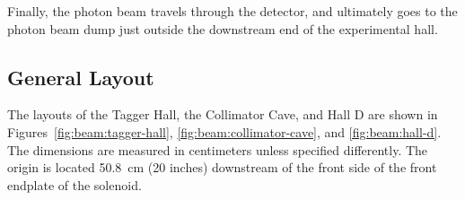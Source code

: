 Finally, the photon beam travels through the \GX{} detector, and
ultimately goes to the photon beam dump just outside the downstream
end of the experimental hall.

\subsection[General Layout (draft)]{General Layout 
  \label{sec:beamline:layout}
}

The layouts of the Tagger Hall, the Collimator Cave, and Hall D are shown in Figures~\ref{fig:beam:tagger-hall},
\ref{fig:beam:collimator-cave}, and \ref{fig:beam:hall-d}. The dimensions are measured in centimeters unless
specified differently. The origin is located 50.8~cm (20 inches) downstream of the front side of the
front endplate of the solenoid. 

